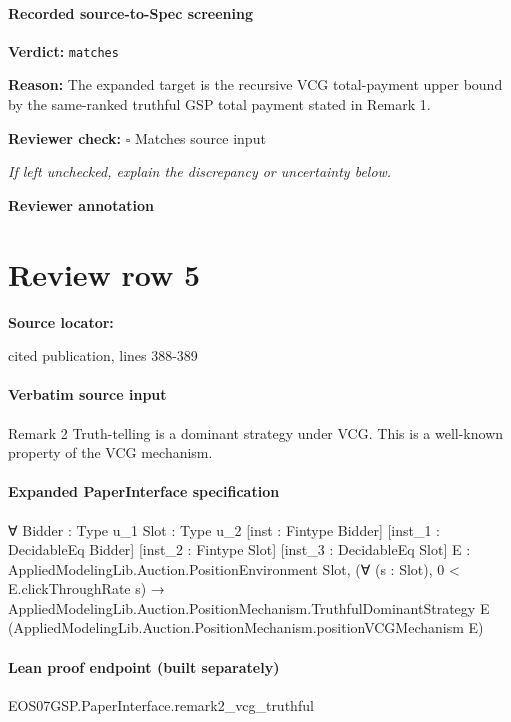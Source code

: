 \documentclass[10pt]{article}
\newcommand{\reviewerbox}{%
  \par\noindent\fbox{\parbox{0.96\linewidth}{\rule{0pt}{0.38in}}}\par
}
\newcommand{\reviewmatch}[1]{%
  \par\noindent\textbf{Reviewer check:} $\square$\; #1\par
  \noindent\emph{If left unchecked, explain the discrepancy or uncertainty below.}\par
}
\begin{document}
\paragraph{Recorded source-to-Spec screening}
\textbf{Verdict:} \texttt{matches}
\\
{\raggedright
\textbf{Reason:} The expanded target is the recursive VCG total-\allowbreak{}payment upper bound by the same-\allowbreak{}ranked truthful GSP total payment stated in Remark 1.\allowbreak{}
\par}
\reviewmatch{Matches source input}
\noindent\textbf{Reviewer annotation}\par
\reviewerbox
\clearpage
\hypertarget{source-claim-912ce3e72e5aabde}{}
\section*{Review row 5}
\textbf{Source locator:} {\footnotesize\raggedright cited publication, lines 388-\allowbreak{}389\par}
\paragraph{Verbatim source input}
\begin{ReviewVerbatim}
Remark 2 Truth-telling is a dominant strategy under VCG.
This is a well-known property of the VCG mechanism.
\end{ReviewVerbatim}



\paragraph{Expanded PaperInterface specification}
\begin{ReviewVerbatim}
∀ {Bidder : Type u_1} {Slot : Type u_2} [inst : Fintype Bidder] [inst_1 : DecidableEq Bidder] [inst_2 : Fintype Slot]
  [inst_3 : DecidableEq Slot] {E : AppliedModelingLib.Auction.PositionEnvironment Slot},
  (∀ (s : Slot), 0 < E.clickThroughRate s) →
    AppliedModelingLib.Auction.PositionMechanism.TruthfulDominantStrategy E
      (AppliedModelingLib.Auction.PositionMechanism.positionVCGMechanism E)
\end{ReviewVerbatim}



\paragraph{Lean proof endpoint (built separately)}\begin{ReviewVerbatim}
EOS07GSP.PaperInterface.remark2_vcg_truthful
\end{ReviewVerbatim}
\end{document}
